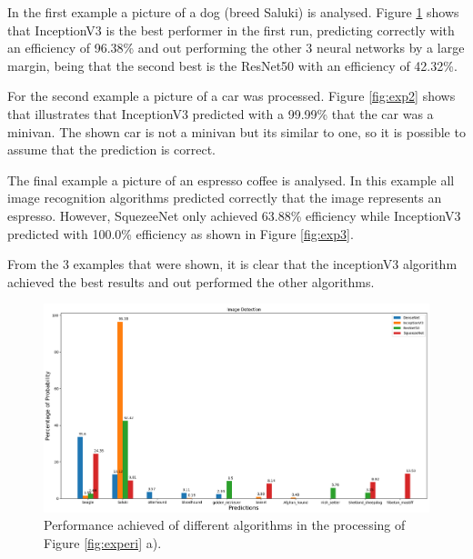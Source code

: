 In the first example a picture of a dog (breed Saluki) is analysed. Figure \ref{fig:exp1} shows that InceptionV3 is the best performer in the first run, predicting correctly with an efficiency of 96.38\% and out performing the other 3 neural networks by a large margin, being that the second best is the ResNet50 with an efficiency of 42.32\%.

For the second example a picture of a car was processed. Figure \ref{fig:exp2} shows that illustrates that InceptionV3 predicted with a 99.99\% that the car was a minivan. The shown car is not a minivan but its similar to one, so it is possible to assume that the prediction is correct.

The final example a picture of an espresso coffee is analysed. In this example all image recognition algorithms predicted correctly that the image represents an espresso. However, SquezeeNet only achieved 63.88\% efficiency while InceptionV3 predicted with 100.0\% efficiency as shown in Figure \ref{fig:exp3}.

From the 3 examples that were shown, it is clear that the inceptionV3 algorithm achieved the best results and out performed the other algorithms.



\begin{figure}[H]
  \centering
  \captionsetup{justification=centering}
  \includegraphics[width=\textwidth]{Sections/4InitialWork/4_images/run1_res.png}
  \caption[Performance achieved of different algorithms]{Performance achieved of different algorithms in the processing of Figure \ref{fig:experi} a).} 
  \label{fig:exp1}
\end{figure}



